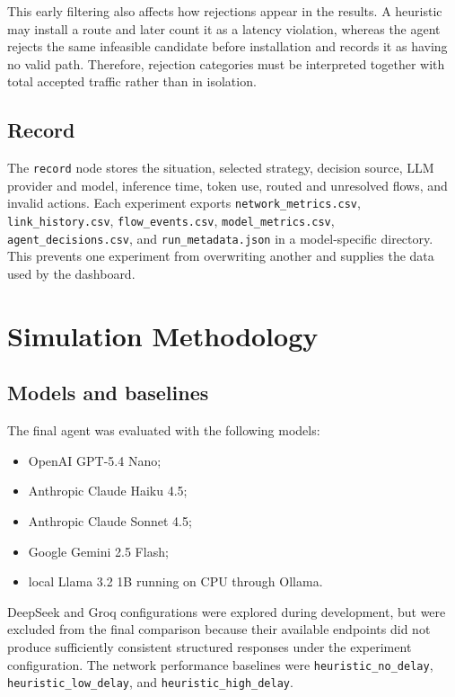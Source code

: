 This early filtering also affects how rejections appear in the results. A heuristic may
install a route and later count it as a latency violation, whereas the agent rejects the
same infeasible candidate before installation and records it as having no valid path.
Therefore, rejection categories must be interpreted together with total accepted
traffic rather than in isolation.

\subsection{Record}

The \texttt{record} node stores the situation, selected strategy, decision source, LLM
provider and model, inference time, token use, routed and unresolved flows, and invalid
actions. Each experiment exports \texttt{network\_metrics.csv},
\texttt{link\_history.csv}, \texttt{flow\_events.csv},
\texttt{model\_metrics.csv}, \texttt{agent\_decisions.csv}, and
\texttt{run\_metadata.json} in a model-specific directory. This prevents one experiment
from overwriting another and supplies the data used by the dashboard.


\section{Simulation Methodology}

\subsection{Models and baselines}

The final agent was evaluated with the following models:

\begin{itemize}
    \item OpenAI GPT-5.4 Nano;
    \item Anthropic Claude Haiku 4.5;
    \item Anthropic Claude Sonnet 4.5;
    \item Google Gemini 2.5 Flash;
    \item local Llama 3.2 1B running on CPU through Ollama.
\end{itemize}

DeepSeek and Groq configurations were explored during development, but were excluded
from the final comparison because their available endpoints did not produce sufficiently
consistent structured responses under the experiment configuration. The network
performance baselines were \texttt{heuristic\_no\_delay},
\texttt{heuristic\_low\_delay}, and \texttt{heuristic\_high\_delay}.

